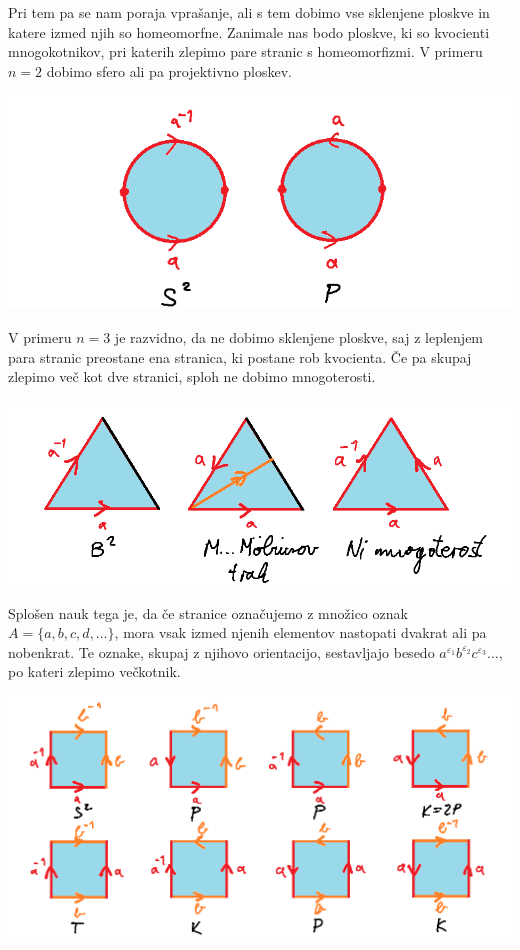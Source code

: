 \documentclass[10pt, a4paper]{article}
\begin{document}
Pri tem pa se nam poraja vprašanje, ali s tem dobimo vse sklenjene ploskve in katere izmed njih 
so homeomorfne. Zanimale nas bodo ploskve, ki so kvocienti mnogokotnikov, pri katerih zlepimo 
pare stranic s homeomorfizmi. V primeru $n = 2$ dobimo sfero ali pa projektivno ploskev.
\begin{center}
  \includegraphics[scale=0.7]{ploskve1.png}
\end{center}
V primeru $n = 3$ je razvidno, da ne dobimo sklenjene ploskve, 
saj z leplenjem para stranic preostane ena stranica, ki postane rob kvocienta.
Če pa skupaj zlepimo več kot dve stranici, sploh ne dobimo mnogoterosti.
\begin{center}
  \includegraphics[scale=0.6]{ploskve2.png}
\end{center}
Splošen nauk tega je, da če stranice označujemo 
z množico oznak $A = \{a, b, c, d, \dots\}$, mora vsak 
izmed njenih elementov nastopati dvakrat ali pa nobenkrat.
Te oznake, skupaj z njihovo orientacijo, sestavljajo besedo 
$a^{\varepsilon_1} b^{\varepsilon_2} c^{\varepsilon_3} \dots$,
po kateri zlepimo večkotnik.

\begin{center}
  \includegraphics[scale=0.50]{ploskve3.png}
\end{center}
\end{document}
